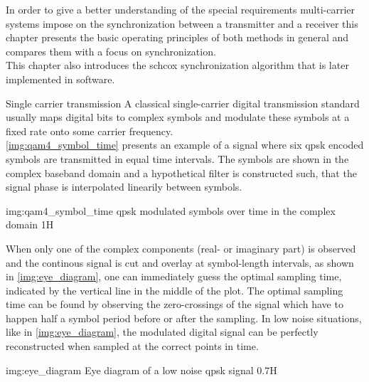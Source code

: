 In order to give a better understanding of the special
requirements multi-carrier systems impose on the
synchronization between a transmitter and a receiver
this chapter presents the basic operating principles
of both methods in general and compares them with
a focus on synchronization. \\

This chapter also introduces the \acrlong{schcox}
synchronization algorithm that is later implemented
in software.

\begin{subchapter}{Single carrier transmission}
  A classical single-carrier digital transmission standard
  usually maps digital bits to complex symbols and modulate these
  symbols at a fixed rate onto some carrier frequency. \\

  \autoref{img:qam4_symbol_time} presents an example of
  a signal where six \acrshort{qpsk} encoded symbols
  are transmitted in equal time intervals.
  The symbols are shown in the complex baseband domain and a
  hypothetical filter is constructed such, that the signal
  phase is interpolated linearily between symbols.

               {img:qam4_symbol_time}
               {\acrshort{qpsk} modulated symbols over time in the complex domain}
               {1}{H}

  When only one of the complex components (real- or imaginary part)
  is observed and the continous signal is cut and overlay at symbol-length
  intervals, as shown in \autoref{img:eye_diagram}, one can
  immediately guess the optimal sampling time, indicated by the
  vertical line in the middle of the plot.
  The optimal sampling time can be found by observing the
  zero-crossings of the signal which have to happen half a
  symbol period before or after the sampling.
  In low noise situations, like in \autoref{img:eye_diagram},
  the modulated digital signal can be perfectly reconstructed
  when sampled at the correct points in time.

                  {img:eye_diagram}
                  {Eye diagram of a low noise \acrshort{qpsk} signal}
                  {0.7}{H}
\end{subchapter}

